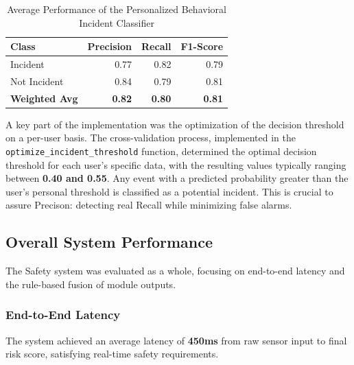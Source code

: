 \documentclass[12pt,a4paper,oneside,english]{book}
\begin{document}
{%
\begin{table}[h!]
    \centering
    \caption{Average Performance of the Personalized Behavioral Incident Classifier}
    \label{tab:behavioral_results}
    \begin{tabular}{lrrr}
        \hline
        \textbf{Class} & \textbf{Precision} & \textbf{Recall} & \textbf{F1-Score} \\ \hline
        Incident       & 0.77               & 0.82            & 0.79              \\
        Not Incident   & 0.84               & 0.79            & 0.81              \\ \hline
        \textbf{Weighted Avg} & \textbf{0.82} & \textbf{0.80} & \textbf{0.81} \\ \hline
    \end{tabular}
\end{table}

A key part of the implementation was the optimization of the decision threshold on a per-user basis. The cross-validation process, 
implemented in the \texttt{optimize\_incident\_threshold} function, determined the optimal decision threshold for each user's specific data, 
with the resulting values typically ranging between \textbf{0.40 and 0.55}. Any event with a predicted probability greater than the user's 
personal threshold is classified as a potential incident. This is crucial to assure Precison: detecting real Recall while minimizing false alarms.


    \subsection{Overall System Performance}
\label{subsec:overall_results}

The Safety system was evaluated as a whole, focusing on end-to-end latency and the rule-based fusion of module outputs.

\subsubsection{End-to-End Latency}
The system achieved an average latency of \textbf{450ms} from raw sensor input to final risk score, satisfying real-time safety requirements.
}
\end{document}
